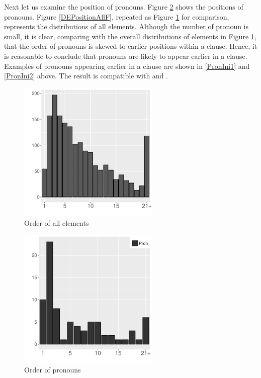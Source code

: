 Next let us examine the position of pronouns.
Figure \ref{WOExpTypeF} shows the positions of pronouns.
Figure \ref{DEPositionAllF}, repeated as Figure \ref{DEPositionAllF2} for comparison,
represents the distributions of all elements.
Although the number of pronoun is small,
it is clear, comparing with the overall distributions of elements in Figure \ref{DEPositionAllF2}, that
the order of pronouns is skewed to earlier positions within a clause.
Hence, it is reasonable to conclude that
pronouns are likely to appear earlier in a clause.
Examples of pronouns appearing earlier in a clause are shown in \ref{PronIni1} and \ref{PronIni2} above.
The result is compatible with  and .


\begin{figure}
	\begin{center}
	\includegraphics[width=0.6\textwidth]{figure/DEPositionAll.pdf}
	\caption{Order of all elements}
	\label{DEPositionAllF2}
	\end{center}
\end{figure}
\begin{figure}
	\begin{center}
	\includegraphics[width=0.6\textwidth]{figure/WOExpType.pdf}
	\caption{Order of pronouns}
	\label{WOExpTypeF}
	\end{center}
\end{figure}

